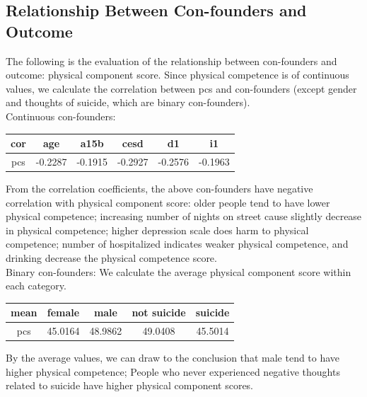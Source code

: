 \documentclass{report}
\begin{document}
\subsection{Relationship Between Con-founders and Outcome}
The following is the evaluation of the relationship between con-founders and outcome: physical component score. Since physical competence is of continuous values, we calculate the correlation between pcs and con-founders (except gender and thoughts of suicide, which are binary con-founders). \\[0.1in]
Continuous con-founders: 
\begin{center}
 \begin{tabular}{||c c c c c c||} 
 \hline
 cor & age & a15b & cesd & d1 & i1  \\ 
 \hline\hline
 pcs & -0.2287 & -0.1915 & -0.2927 & -0.2576 & -0.1963\\
 \hline
\end{tabular}
\end{center}
From the correlation coefficients, the above con-founders have negative correlation with physical component score: older people tend to have lower physical competence; increasing number of nights on street cause slightly decrease in physical competence; higher depression scale does harm to physical competence; number of hospitalized indicates weaker physical competence, and drinking decrease the physical competence score. \\[0.1in]
Binary con-founders: We calculate the average physical component score within each category. 
\begin{center}
 \begin{tabular}{||c | c c || c c ||} 
 \hline
 mean & female & male & not suicide & suicide \\ 
 \hline
 pcs & 45.0164 & 48.9862 & 49.0408 & 45.5014 \\
 \hline
\end{tabular}
\end{center}
By the average values, we can draw to the conclusion that male tend to have higher physical competence; People who never experienced negative thoughts related to suicide have higher physical component scores. 
\end{document}
